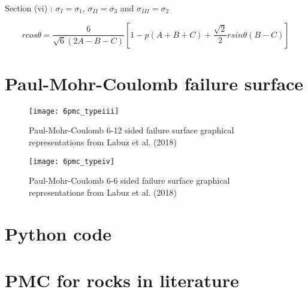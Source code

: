 Section (vi) : $\sigma_I = \sigma_1$, $\sigma_{II} = \sigma_3$ and $\sigma_{III} = \sigma_2$

\begin{equation}
    r cos\theta = \frac{6}{\sqrt{6}(2A-B-C)} \left[ 1-p(A+B+C)+ \frac{\sqrt{2}}{2} r sin \theta (B-C) \right]
\end{equation}

\chapter{Paul-Mohr-Coulomb failure surface}

\begin{figure}
    \centering
    \texttt{[image: 6pmc\_typeiii]}
    \caption{Paul-Mohr-Coulomb 6-12 sided failure surface graphical representations from Labuz et al. (2018) \cite{Labuz2018}}
    \label{fig5:6pmc_typeiii}
\end{figure}

\begin{figure}
    \centering
    \texttt{[image: 6pmc\_typeiv]}
    \caption{Paul-Mohr-Coulomb 6-6 sided failure surface graphical representations from Labuz et al. (2018) \cite{Labuz2018}}
    \label{fig5:6pmc_typeiv}
\end{figure}

\chapter{Python code}
\chapter{PMC for rocks in literature}